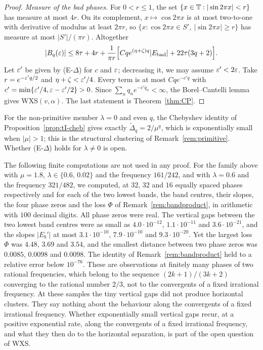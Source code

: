 \begin{proof}
\emph{Measure of the bad phases.} For $0<r\le1$, the set $\{x\in\mathbb T:|\sin2\pi x|<r\}$ has measure at most $4r$. On its complement, $x\mapsto\cos2\pi x$ is at most two-to-one with derivative of modulus at least $2\pi r$, so $\{x:\cos2\pi x\in S',\ |\sin2\pi x|\ge r\}$ has measure at most $|S'|/(\pi r)$. Altogether
\[
|B_q(\varepsilon)|\le8\tau+4r+\frac1{\pi r}\Bigl[Cqe^{(\eta+\zeta)q}|E_{\mathrm{bad}}|+22\tau(3q+2)\Bigr].
\]
Let $\varepsilon'$ be given by (E-$\Delta$) for $c$ and $\varepsilon$; decreasing it, we may assume $\varepsilon'<2\varepsilon$. Take $r=e^{-\varepsilon'q/2}$ and $\eta+\zeta<\varepsilon'/4$. Every term is at most $Cqe^{-c'q}$ with $c'=\min\{\varepsilon'/4,\varepsilon-\varepsilon'/2\}>0$. Since $\sum_nq_ne^{-c'q_n}<\infty$, the Borel--Cantelli lemma gives WXS$(v,\alpha)$. The last statement is Theorem~\ref{thm:CP}.
\end{proof}

For the non-primitive member $\lambda=0$ and even $q$, the Chebyshev identity of Proposition~\ref{prop:tI-cheb} gives exactly $\tilde\Delta_q=2/\mu^q$, which is exponentially small when $|\mu|>1$; this is the structural clustering of Remark~\ref{rem:primitive}. Whether (E-$\Delta$) holds for $\lambda\ne0$ is open.

\begin{remark}\label{rem:numerics}
The following finite computations are not used in any proof. For the family above with $\mu=1.8$, $\lambda\in\{0.6,\,0.02\}$ and the frequency $161/242$, and with $\lambda=0.6$ and the frequency $321/482$, we computed, at $32$, $32$ and $16$ equally spaced phases respectively and for each of the two lowest bands, the band centres, their slopes, the four phase zeros and the loss $\Phi$ of Remark~\ref{rem:bandproduct}, in arithmetic with $100$ decimal digits. All phase zeros were real. The vertical gaps between the two lowest band centres were as small as $4.0\cdot10^{-12}$, $1.1\cdot10^{-11}$ and $3.6\cdot10^{-21}$, and the slopes $|E_b'|$ at most $3.1\cdot10^{-10}$, $7.9\cdot10^{-10}$ and $9.3\cdot10^{-20}$. Yet the largest loss $\Phi$ was $4.48$, $3.69$ and $3.54$, and the smallest distance between two phase zeros was $0.0085$, $0.0098$ and $0.0098$. The identity of Remark~\ref{rem:bandproduct} held to a relative error below $10^{-76}$. These are observations at finitely many phases of two rational frequencies, which belong to the sequence $(2k+1)/(3k+2)$ converging to the rational number $2/3$, not to the convergents of a fixed irrational frequency. At these samples the tiny vertical gaps did not produce horizontal clusters. They say nothing about the behaviour along the convergents of a fixed irrational frequency. Whether exponentially small vertical gaps recur, at a positive exponential rate, along the convergents of a fixed irrational frequency, and what they then do to the horizontal separation, is part of the open question of WXS.
\end{remark}
